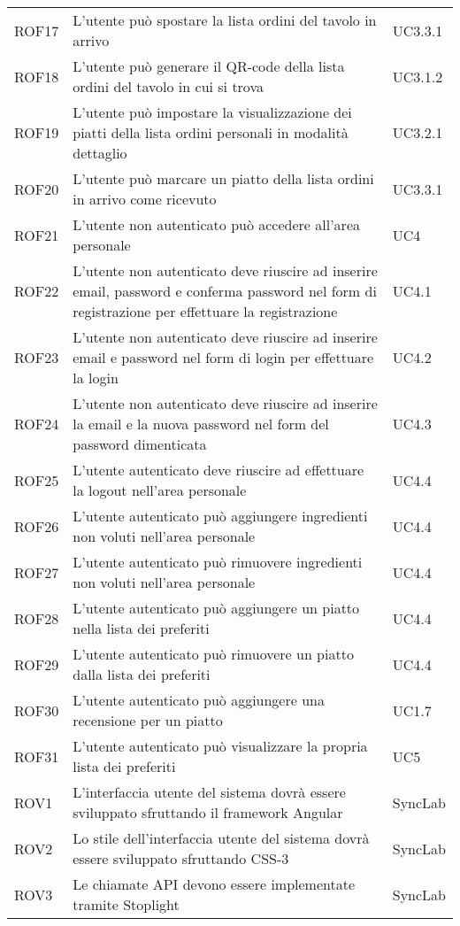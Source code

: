 \begin{center}
\begin{longtable}{ |p{1.5cm}|p{9cm}|p{1.5cm}|  }
        ROF17&L'utente può spostare la lista ordini del tavolo in arrivo &UC3.3.1 \\
        ROF18&L'utente può generare il QR-code della lista ordini del tavolo in cui si trova &UC3.1.2 \\
        ROF19&L'utente può impostare la visualizzazione dei piatti della lista ordini personali in modalità dettaglio&UC3.2.1 \\
        ROF20&L'utente può marcare un piatto della lista ordini in arrivo come ricevuto&UC3.3.1 \\
        ROF21&L'utente non autenticato può accedere all'area personale&UC4\\
        ROF22&L'utente non autenticato deve riuscire ad inserire email, password e conferma password nel form di registrazione per effettuare la registrazione &UC4.1\\
        ROF23&L'utente non autenticato deve riuscire ad inserire email e password nel form di login per effettuare la login &UC4.2\\
        ROF24&L'utente non autenticato deve riuscire ad inserire la email e la nuova password nel form del password dimenticata&UC4.3\\
        ROF25&L'utente autenticato deve riuscire ad effettuare la logout nell'area personale&UC4.4\\
        ROF26&L'utente autenticato può aggiungere ingredienti non voluti nell'area personale&UC4.4\\
        ROF27&L'utente autenticato può rimuovere ingredienti non voluti nell'area personale&UC4.4\\
        ROF28&L'utente autenticato può aggiungere un piatto nella lista dei preferiti&UC4.4\\
        ROF29&L'utente autenticato può rimuovere un piatto dalla lista dei preferiti&UC4.4\\
        ROF30&L'utente autenticato può aggiungere una recensione per un piatto&UC1.7\\
        ROF31&L'utente autenticato può visualizzare la propria lista dei preferiti&UC5\\
        ROV1&L'interfaccia utente del sistema dovrà essere sviluppato sfruttando il framework Angular&SyncLab\\
        ROV2&Lo stile dell'interfaccia utente del sistema dovrà essere sviluppato sfruttando CSS-3&SyncLab\\
        ROV3&Le chiamate API devono essere implementate tramite Stoplight&SyncLab\\

\end{longtable}
\end{center}
